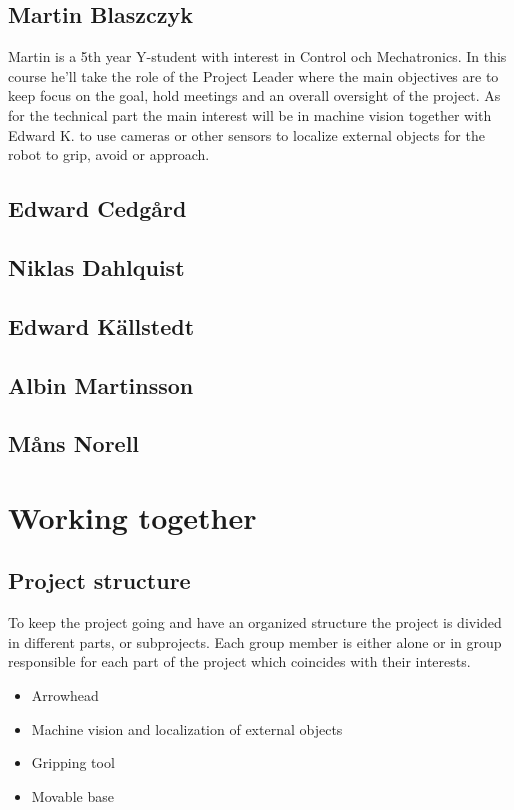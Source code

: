 
\section*{Martin Blaszczyk}
Martin is a 5th year Y-student with interest in Control och Mechatronics. 
In this course he'll take the role of the Project Leader where the main objectives
are to keep focus on the goal, hold meetings and an overall oversight of the project. 
As for the technical part the main interest will be in machine vision together with
Edward K. to use cameras or other sensors to localize external objects for the 
robot to grip, avoid or approach.

\section*{Edward Cedgård}


\section*{Niklas Dahlquist}

\section*{Edward Källstedt}


\section*{Albin Martinsson}


\section*{Måns Norell}


\chapter{Working together}
\section*{Project structure}
To keep the project going and have an organized structure the project is divided 
in different parts, or subprojects. Each group member is either alone or in group responsible for each part of the project which coincides with their interests. 
\begin{itemize}
    \item Arrowhead
    \item Machine vision and localization of external objects
    \item Gripping tool
    \item Movable base
\end{itemize}

